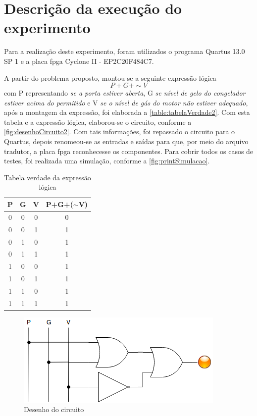 
\chapter{Descrição da execução do experimento}
Para a realização deste experimento, foram utilizados o programa Quartus 13.0 SP 1 e a placa \ac{fpga}
Cyclone II - EP2C20F484C7.

A partir do problema proposto, montou-se a seguinte expressão lógica
$$ P + G + \sim V$$
com P representando \textit{se a porta estiver aberta}, G
\textit{se nível de gelo do congelador estiver acima do permitido} e V
\textit{se o nível de gás do motor não estiver adequado}, após a
montagem da expressão, foi elaborada a \autoref{table:tabelaVerdade2}. Com esta tabela e a expressão lógica,
elaborou-se o circuito, conforme a \autoref{fig:desenhoCircuito2}. Com tais informações, foi repassado o circuito
para o Quartus, depois renomeou-se as entradas e saídas para que, por meio do arquivo tradutor, a placa
\ac{fpga} reconhecesse os componentes.
Para cobrir todos os casos de testes, foi realizada uma simulação, conforme a \autoref{fig:printSimulacao}.

\begin{table}[h]
	\centering
	\caption{Tabela verdade da expressão lógica}\label{table:tabelaVerdade2}
	\begin{tabular}{c|c|c|c}
		\textbf{P} & \textbf{G} & \textbf{V} & \textbf{P+G+($\sim$V)} \\
		\hline
		0 & 0 & 0 & 0\\\hline
		0 & 0 & 1 & 1\\\hline
		0 & 1 & 0 & 1\\\hline
		0 & 1 & 1 & 1\\\hline
		1 & 0 & 0 & 1\\\hline
		1 & 0 & 1 & 1\\\hline
		1 & 1 & 0 & 1\\\hline
		1 & 1 & 1 & 1
	\end{tabular}
\end{table}

\begin{figure}[htb]
    \centering
	\caption{\label{fig:desenhoCircuito2}Desenho do circuito}
	\includegraphics{img/cenario2/desenhoCircuito}
\end{figure}



